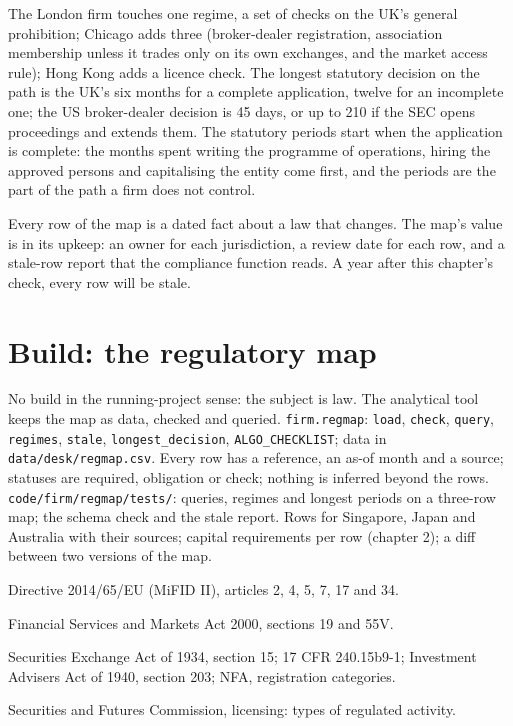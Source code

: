 The London firm touches one regime, a set of checks on the UK's general prohibition; Chicago adds three (broker-dealer registration, association
membership unless it trades only on its own exchanges, and the market access rule); Hong Kong adds a licence check. The longest statutory decision on
the path is the UK's six months for a complete application, twelve for an incomplete one; the US broker-dealer decision is 45 days, or up to 210 if
the SEC opens proceedings and extends them. The statutory periods start when the application is complete: the months spent writing the programme of
operations, hiring the approved persons and capitalising the entity come first, and the periods are the part of the path a firm does not control.

\begin{remark}\label{rem:fm:regulators-and-licences:upkeep}
Every row of the map is a dated fact about a law that changes. The map's value is in its upkeep: an owner for each jurisdiction, a review date for
each row, and a stale-row report that the compliance function reads. A year after this chapter's check, every row will be stale.
\end{remark}

\section{Build: the regulatory map}\label{bld:fm:regulators-and-licences:regmap}

\begin{build}
 No build in the running-project sense: the subject is law. The analytical tool keeps the map as data, checked and queried.
 \texttt{firm.regmap}: \texttt{load}, \texttt{check}, \texttt{query}, \texttt{regimes}, \texttt{stale}, \texttt{longest\_decision},
\texttt{ALGO\_CHECKLIST}; data in \texttt{data/desk/regmap.csv}.
 Every row has a reference, an as-of month and a source; statuses are required, obligation or check; nothing is inferred beyond the
rows.
 \texttt{code/firm/regmap/tests/}: queries, regimes and longest periods on a three-row map; the schema check and the stale
report.
 Rows for Singapore, Japan and Australia with their sources; capital requirements per row (chapter 2); a diff between two versions
of the map.
\end{build}

\begin{omsources}
\item Directive 2014/65/EU (MiFID II), articles 2, 4, 5, 7, 17 and 34.
\item Financial Services and Markets Act 2000, sections 19 and 55V.
\item Securities Exchange Act of 1934, section 15; 17 CFR 240.15b9-1; Investment Advisers Act of 1940, section 203; NFA, registration categories.
\item Securities and Futures Commission, licensing: types of regulated activity.
\end{omsources}

